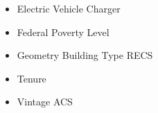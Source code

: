 \begin{itemize}
\item Electric Vehicle Charger
\item Federal Poverty Level
\item Geometry Building Type RECS
\item Tenure
\item Vintage ACS
\end{itemize}
